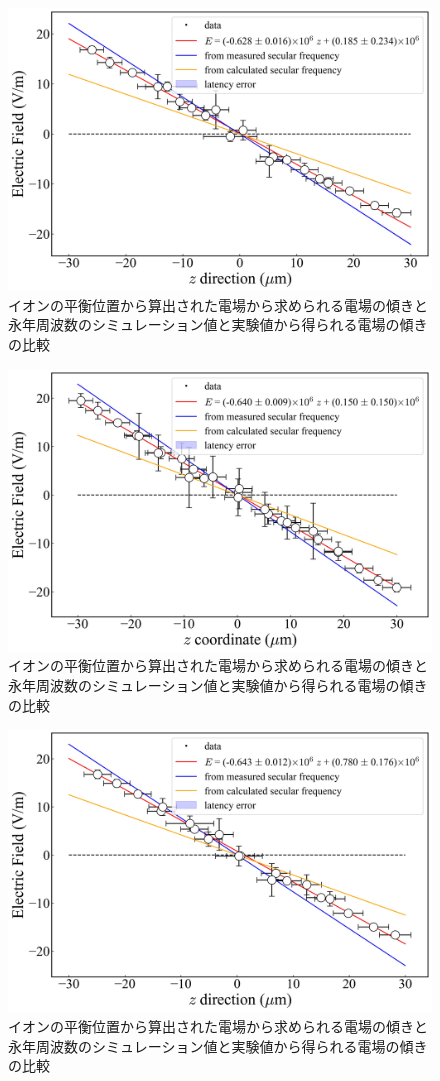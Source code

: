 \begin{figure}[h]
	\begin{center}
		\includegraphics[width = 0.6\linewidth]{./results/figure/DC1_COMP.jpg}
		\caption{イオンの平衡位置から算出された電場から求められる電場の傾きと永年周波数のシミュレーション値と実験値から得られる電場の傾きの比較}
		\label{fig:DC1_COMP}
	\end{center}
\end{figure}
\begin{figure}[h]
	\begin{center}
		\includegraphics[width = 0.6\linewidth]{./results/figure/DC2_COMP.jpg}
		\caption{イオンの平衡位置から算出された電場から求められる電場の傾きと永年周波数のシミュレーション値と実験値から得られる電場の傾きの比較}
		\label{fig:DC2_COMP}
	\end{center}
\end{figure}
\begin{figure}[h]
	\begin{center}
		\includegraphics[width = 0.6\linewidth]{./results/figure/DC3_COMP.jpg}
		\caption{イオンの平衡位置から算出された電場から求められる電場の傾きと永年周波数のシミュレーション値と実験値から得られる電場の傾きの比較}
		\label{fig:DC3_COMP}
	\end{center}
\end{figure}

